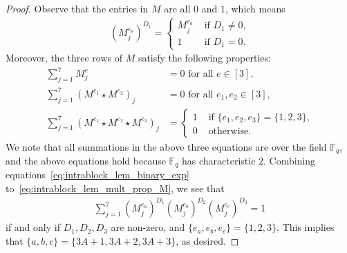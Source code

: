 \documentclass[11pt]{article}
\theoremstyle{definition}
\newcommand{\FF}{\mathbb{F}}
\begin{document}
\begin{proof}
    Observe that the entries in $M$ are all $0$ and $1$, which means 
    \begin{align}
        (M^{e_a}_j)^{D_1} = 
        \begin{cases}
            M^{e_a}_j &\text{ if $D_1\ne 0$,}\\
            1         &\text{ if } D_1 = 0.
        \end{cases}
        \label{eq:intrablock_lem_binary_exp}
    \end{align}
    Moreover, the three rows of $M$ satisfy the following properties: 
    \begin{align}
        \sum_{j=1}^7 M^{e}_j &= 0 \text{ for all $e\in [3]$, } \\
        \sum_{j=1}^7 (M^{e_1}\star M^{e_2})_j &= 0 \text{   for all $e_1,e_2\in [3]$,} \\
        \sum_{j=1}^7 (M^{e_1}\star M^{e_2}\star M^{e_3})_j &=
        \begin{cases}
            1 &\text{ if $\{e_1,e_2,e_3\} = \{1,2,3\}$,} \\
            0 &\text{ otherwise.}
        \end{cases}
        \label{eq:intrablock_lem_mult_prop_M}
    \end{align}
    We note that all summations in the above three equations are over the field $\FF_q$, and the above equations hold because $\FF_q$ has characteristic $2$.
    Combining equations~\eqref{eq:intrablock_lem_binary_exp} to~\eqref{eq:intrablock_lem_mult_prop_M}, we see that 
    \begin{align}
        \sum_{j=1}^7 
        (M^{e_a}_{j})^{D_1} (M^{e_b}_{j})^{D_2} (M^{e_c}_{j})^{D_3} = 1
    \end{align}
    if and only if $D_1,D_2,D_3$ are non-zero, and $\{e_a,e_b,e_c\} = \{1,2,3\}$. 
    This implies that $\{a,b,c\} = \{3A+1,3A+2,3A+3\}$, as desired. 
\end{proof}
\end{document}
